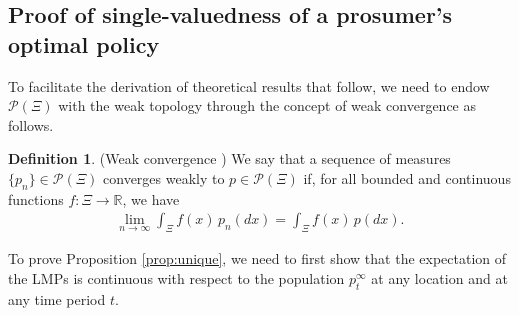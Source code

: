 \documentclass{article}
\theoremstyle{definition}
\newtheorem{definition}{Definition}
\theoremstyle{plain}
\begin{document}
\subsection{Proof of single-valuedness of a prosumer's optimal policy} \label{subsec:PolicyUnique}
To facilitate the derivation of theoretical results that follow, we need to endow $\mathcal{P}(\Xi)$ with the weak topology through the concept of weak convergence as follows.

\begin{definition}
	\label{def:weak}
	(Weak convergence \citep{guide2006infinite}) 
	We say that a sequence of measures $\{p_n\} \in \mathcal{P}(\Xi)$ converges weakly to $p \in \mathcal{P}(\Xi)$ if, for all bounded and continuous functions $f:\Xi \to \mathbb{R}$, we have
	\begin{align*}
	\lim _{n \to \infty}\int_{\Xi} f(x) \, p_n(dx) = \int_{\Xi} f(x) \, p(dx).
	\end{align*}
\end{definition}

To prove Proposition \ref{prop:unique}, we need to first show that the expectation of the LMPs is continuous with respect to the population \(p^{\infty}_{t}\) at any location and at any time period \(t\).
\end{document}
